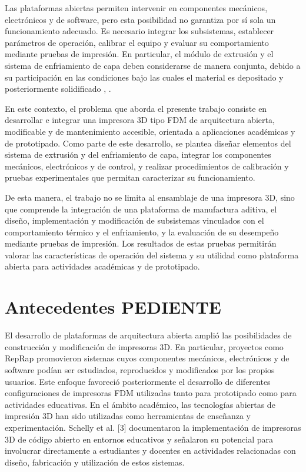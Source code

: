 Las plataformas abiertas permiten intervenir en componentes mecánicos, electrónicos y de software, pero esta posibilidad no garantiza por sí sola un funcionamiento adecuado. Es necesario integrar los subsistemas, establecer parámetros de operación, calibrar el equipo y evaluar su comportamiento mediante pruebas de impresión. En particular, el módulo de extrusión y el sistema de enfriamiento de capa deben considerarse de manera conjunta, debido a su participación en las condiciones bajo las cuales el material es depositado y posteriormente solidificado \cite{kechagias_2022}, \cite{zhang_2019}.

En este contexto, el problema que aborda el presente trabajo consiste en desarrollar e integrar una impresora 3D tipo FDM de arquitectura abierta, modificable y de mantenimiento accesible, orientada a aplicaciones académicas y de prototipado. Como parte de este desarrollo, se plantea diseñar elementos del sistema de extrusión y del enfriamiento de capa, integrar los componentes mecánicos, electrónicos y de control, y realizar procedimientos de calibración y pruebas experimentales que permitan caracterizar su funcionamiento.

De esta manera, el trabajo no se limita al ensamblaje de una impresora 3D, sino que comprende la integración de una plataforma de manufactura aditiva, el diseño, implementación y modificación de subsistemas vinculados con el comportamiento térmico y el enfriamiento, y la evaluación de su desempeño mediante pruebas de impresión. Los resultados de estas pruebas permitirán valorar las características de operación del sistema y su utilidad como plataforma abierta para actividades académicas y de prototipado.

\section{Antecedentes PEDIENTE}

El desarrollo de plataformas de arquitectura abierta amplió las posibilidades de construcción y modificación de impresoras 3D. En particular, proyectos como RepRap promovieron sistemas cuyos componentes mecánicos, electrónicos y de software podían ser estudiados, reproducidos y modificados por los propios usuarios. Este enfoque favoreció posteriormente el desarrollo de diferentes configuraciones de impresoras FDM utilizadas tanto para prototipado como para actividades educativas.
En el ámbito académico, las tecnologías abiertas de impresión 3D han sido utilizadas como herramientas de enseñanza y experimentación. Schelly et al. [3] documentaron la implementación de impresoras 3D de código abierto en entornos educativos y señalaron su potencial para involucrar directamente a estudiantes y docentes en actividades relacionadas con diseño, fabricación y utilización de estos sistemas.

